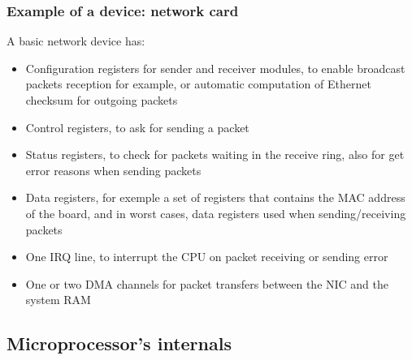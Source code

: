 \begin{frame}
  \frametitle{Example of a device: network card}

  A basic network device has:

  \begin{itemize}
  \item
    Configuration registers for sender and receiver modules, to enable
    broadcast packets reception for example, or automatic computation
    of Ethernet checksum for outgoing packets
  \item
    Control registers, to ask for sending a packet
  \item
    Status registers, to check for packets waiting in the receive
    ring, also for get error reasons when sending packets
  \item
    Data registers, for exemple a set of registers that contains the
    MAC address of the board, and in worst cases, data registers used
    when sending/receiving packets
  \end{itemize}

  \-

  \begin{itemize}
  \item
    One IRQ line, to interrupt the CPU on packet receiving or sending error
  \item
    One or two DMA channels for packet transfers between the NIC and
    the system RAM
  \end{itemize}

\end{frame}

%
%

\subsection{Microprocessor's internals}


